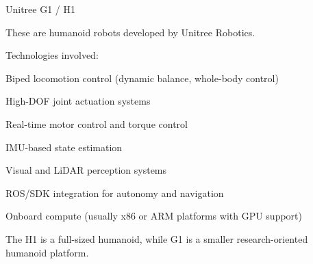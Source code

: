 \documentclass[a4paper]{article}
\title{}
\date{}
\begin{document}
    \maketitle
    Unitree G1 / H1

    These are humanoid robots developed by Unitree Robotics.
    
    Technologies involved:
    
    Biped locomotion control (dynamic balance, whole-body control)
    
    High-DOF joint actuation systems
    
    Real-time motor control and torque control
    
    IMU-based state estimation
    
    Visual and LiDAR perception systems
    
    ROS/SDK integration for autonomy and navigation
    
    Onboard compute (usually x86 or ARM platforms with GPU support)
    
    The H1 is a full-sized humanoid, while G1 is a smaller research-oriented humanoid platform.
\end{document}
